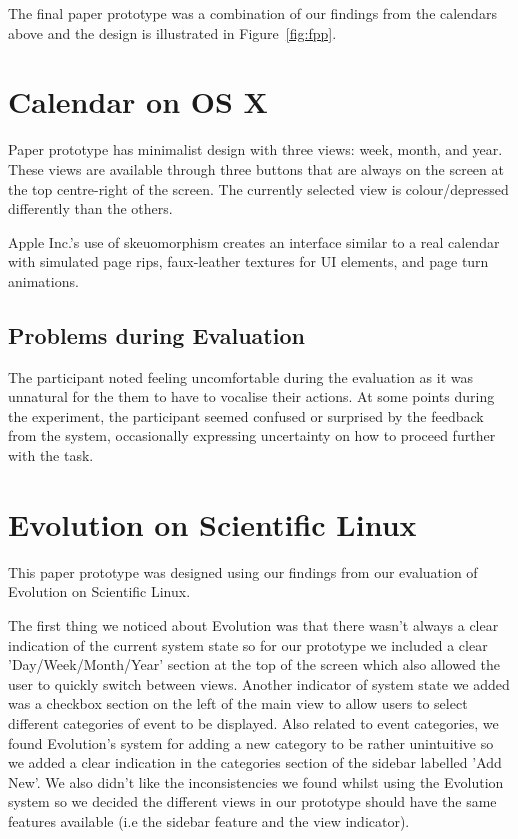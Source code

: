 \documentclass{article}
\begin{document}
The final paper prototype was a combination of our findings from the
calendars above and the design is illustrated in Figure~\ref{fig:fpp}.

\section{Calendar on OS X}

Paper prototype has minimalist design with three views: week, month,
and year. These views are available through three buttons that are
always on the screen at the top centre-right of the screen. The
currently selected view is colour/depressed differently than the
others.

Apple Inc.'s use of skeuomorphism creates an interface similar to a real 
calendar with simulated page rips, faux-leather textures for UI
elements, and page turn animations.

\subsection{Problems during Evaluation}

The participant noted feeling uncomfortable during the evaluation as it
was unnatural for the them to have to vocalise their actions. At some
points during the experiment, the participant seemed confused or
surprised by the feedback from the system, occasionally expressing
uncertainty on how to proceed further with the task.

\section{Evolution on Scientific Linux}

This paper prototype was designed using our findings from our evaluation 
of Evolution on Scientific Linux.

The first thing we noticed about Evolution was that there wasn't always
a clear indication of the current system state so for our prototype we
included a clear 'Day/Week/Month/Year' section at the top of the screen
which also allowed the user to quickly switch between views. Another
indicator of system state we added was a checkbox section on the left of
the main view to allow users to select different categories of event to
be displayed. Also related to event categories, we found Evolution's
system for adding a new category to be rather unintuitive so we added a
clear indication in the categories section of the sidebar labelled
'Add New'. We also didn't like the inconsistencies we found whilst
using the Evolution system so we decided the different views in our
prototype should have the same features available (i.e the sidebar
feature and the view indicator).
\end{document}
